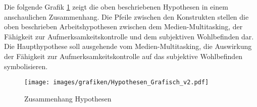\par
Die folgende Grafik \ref{pic.einleitung.hypothesen} zeigt die oben beschriebenen Hypothesen in einem anschaulichen Zusammenhang. Die Pfeile zwischen den Konstrukten stellen die oben beschrieben Arbeitshypothesen zwischen dem Medien-Multitasking, der Fähigkeit zur Aufmerksamkeitskontrolle und dem subjektiven Wohlbefinden dar. Die Haupthypothese soll ausgehende vom Medien-Multitasking, die Auswirkung der Fähigkeit zur Aufmerksamkeitskontrolle auf das subjektive Wohlbefinden symbolisieren.
\begin{figure}[ht]
    \centering
    \texttt{[image: images/grafiken/Hypothesen\_Grafisch\_v2.pdf]}
     \caption{Zusammenhang Hypothesen}
     \label{pic.einleitung.hypothesen}
\end{figure}




